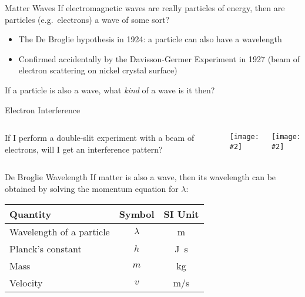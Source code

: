 \documentclass[12pt,compress,aspectratio=169]{beamer}
\newcommand{\pic}[2]{\texttt{[image: \#2]}}
\newcommand{\eq}[2]{\vspace{#1}{\Large\begin{displaymath}#2\end{displaymath}}}
\begin{document}



\begin{frame}{Matter Waves}
  If electromagnetic waves are really particles of energy, then are particles
  (e.g.\ electrons) a wave of some sort?
  \begin{itemize}
  \item The De Broglie hypothesis in 1924: a particle can also have a
    wavelength
  \item Confirmed accidentally by the Davisson-Germer Experiment in 1927 (beam
    of electron scattering on nickel crystal surface)
  \end{itemize}

  \vspace{.1in}If a particle is also a wave, what \emph{kind} of a wave is it
  then?
\end{frame}



\begin{frame}{Electron Interference}
  \begin{columns}
    If I perform a double-slit experiment with a beam of electrons, will I get
    an interference pattern?
    \begin{center}
      \pic{.7}{CNX_Chem_06_03_Electrnin}
    \end{center}

    \pic{1}{206px-Double-slit_experiment_results_Tanamura_2.jpg}
  \end{columns}
\end{frame}



\begin{frame}{De Broglie Wavelength}
  If matter is also a wave, then its wavelength can be obtained by solving the
  momentum equation for $\lambda$:

  \eq{-.2in}{
    p=\frac{h}{\lambda}\;\;\rightarrow\;\;
    \lambda=\frac{h}{p}\;\;\rightarrow\;\;\boxed{\lambda=\frac{h}{mv}}
  }

  \vspace{-.1in}
  \begin{center}
    \begin{tabular}{l|c|c}
      \rowcolor{pink}
      \textbf{Quantity} & \textbf{Symbol} & \textbf{SI Unit} \\ \hline
      Wavelength of a particle & $\lambda$ & \si{\metre} \\
      Planck's constant & $h$  & \si{\joule.\second} \\
      Mass              & $m$  & \si{\kilo\gram} \\
      Velocity          & $v$  & \si{\metre/\second}
    \end{tabular}
  \end{center}
\end{frame}
\end{document}
